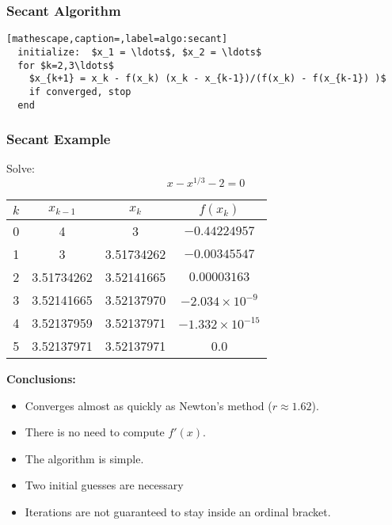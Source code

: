 \documentclass[10pt]{beamer}
\begin{document}
\begin{frame}[fragile]
\frametitle{Secant Algorithm}

\begin{lstlisting}[mathescape,caption=,label=algo:secant]
  initialize:  $x_1 = \ldots$, $x_2 = \ldots$                   
  for $k=2,3\ldots$                                           
    $x_{k+1} = x_k - f(x_k) (x_k - x_{k-1})/(f(x_k) - f(x_{k-1}) )$  
    if converged, stop       
  end
\end{lstlisting}





\end{frame}
\begin{frame}
\frametitle{Secant Example}

Solve:
\begin{equation*}
    x - x^{1/3} - 2 = 0
\end{equation*}

\vspace{2ex}
\begin{center}
  \small
    \begin{tabular}{cccc}
       $k$ &   $x_{k-1}$  &    $x_k$   & $f(x_k)$                  \\ \hline
        0  &  4           & 3          & $-0.44224957$               \\
        1  &  3           & 3.51734262 & $-0.00345547$               \\
        2  &  3.51734262  & 3.52141665 & $0.00003163 $              \\
        3  &  3.52141665  & 3.52137970 & $-2.034\times 10^{-9}$  \\
        4  &  3.52137959  & 3.52137971 & $-1.332\times 10^{-15}$ \\
        5  &  3.52137971  & 3.52137971 &  0.0                      \\
        \end{tabular}
\end{center}

\vspace{4ex}

\textbf{Conclusions:}
\vspace{0.0cm}
\begin{itemize}
    \item   Converges almost as quickly as Newton's method ($r\approx
1.62$).
    \item   There is no need to compute $f'(x)$.
    \item   The algorithm is simple.
    \item   Two initial guesses are necessary
    \item   Iterations are not guaranteed to stay inside an ordinal bracket.
\end{itemize}




\end{frame}
\end{document}
